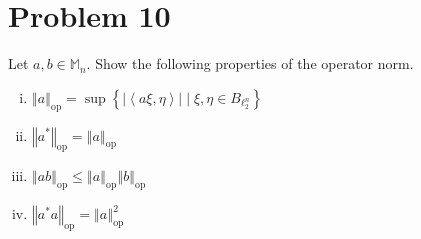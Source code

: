 \documentclass[8pt]{extarticle}
\newcommand{\iprod}[2]{\left\langle #1,#2\right\rangle}
\newcommand{\norm}[1]{\left\Vert #1\right\Vert}
\begin{document}
  \section{Problem 10}%
  Let $a,b\in \mathbb{M}_{n}$. Show the following properties of the operator norm.
  \begin{enumerate}[(i)]
    \item $\norm{a}_{\text{op}} = \sup\left\{|\iprod{a\xi}{\eta}|\mid \xi,\eta\in B_{\ell_{2}^{n}} \right\}$
    \item $\norm{a^{\ast}}_{\text{op}} = \norm{a}_{\text{op}}$
    \item $\norm{ab}_{\text{op}} \leq \norm{a}_{\text{op}}\norm{b}_{\text{op}}$
    \item $\norm{a^{\ast}a}_{\text{op}} = \norm{a}^{2}_{\text{op}}$
  \end{enumerate}
\end{document}
